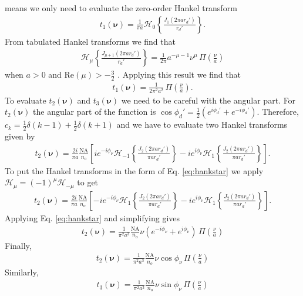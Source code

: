\documentclass[11pt]{article}
\providecommand{\bs}[1]{\boldsymbol{#1}}
\begin{document}
means we only need to evaluate the zero-order Hankel transform
\begin{align}
  t_1(\bs{\nu}) = \frac{1}{\pi a}\mathcal{H}_0\left\{\frac{J_1(2\pi ar_d')}{r_d'}\right\}.
\end{align}
From tabulated Hankel transforms we find that
\begin{align}
  \mathcal{H}_{\mu}\left\{\frac{J_{\mu+1}(2\pi ar_d')}{r_d'}\right\} =
  \frac{1}{2\pi}a^{-\mu-1}\nu^\mu\, \Pi\left(\frac{\nu}{a}\right)\label{eq:hankstar}
\end{align}
when $a > 0$ and $\text{Re}(\mu) > -\frac{3}{2}$ \cite{poul1998}. Applying this result
we find that
\begin{align}
  t_1(\bs{\nu}) =
    \frac{1}{2\pi^2 a^{2}}\, \Pi\left(\frac{\nu}{a}\right)\label{eq:t1final}.
\end{align}
To evaluate $t_2(\bs{\nu})$ and $t_3(\bs{\nu})$ we need to be careful with the angular part. For $t_2(\bs{\nu})$
the angular part of the function is $\cos\phi_d' = \frac{1}{2}\left(e^{i\phi_d'} + e^{-i\phi_d'}\right)$. Therefore, $c_k = \frac{1}{2}\delta(k-1) + \frac{1}{2}\delta(k+1)$ and we have to evaluate two Hankel transforms given by
\begin{align}
  t_2(\bs{\nu}) = \frac{2i}{\pi a}\frac{\text{NA}}{n_o}\left[ie^{-i\phi_{\nu}}\mathcal{H}_{-1}\left\{\frac{J_2(2\pi ar_d')}{\pi ar_d'}\right\} - ie^{i\phi_{\nu}}\mathcal{H}_{1}\left\{\frac{J_2(2\pi ar_d')}{\pi ar_d'}\right\}\right].
\end{align}
To put the Hankel transforms in the form of Eq. \ref{eq:hankstar} we apply
$\mathcal{H}_\mu = (-1)^\mu\mathcal{H}_{-\mu}$ to get
\begin{align}
  t_2(\bs{\nu}) = \frac{2i}{\pi a}\frac{\text{NA}}{n_o}\left[-ie^{-i\phi_{\nu}}\mathcal{H}_{1}\left\{\frac{J_2(2\pi ar_d')}{\pi ar_d'}\right\} - ie^{i\phi_{\nu}}\mathcal{H}_{1}\left\{\frac{J_2(2\pi ar_d')}{\pi ar_d'}\right\}\right].
\end{align}
Applying Eq. \ref{eq:hankstar} and simplifying gives
\begin{align}
  t_2(\bs{\nu}) =
    \frac{1}{\pi^2 a^3}\frac{\text{NA}}{n_o}\nu(e^{-i\phi_\nu} + e^{i\phi_\nu})\, \Pi\left(\frac{\nu}{a}\right)
\end{align}
Finally, 
\begin{align}
  t_2(\bs{\nu}) =
    \frac{1}{\pi^2 a^3}\frac{\text{NA}}{n_o}\nu\cos\phi_{\nu}\, \Pi\left(\frac{\nu}{a}\right)\label{eq:t2final}
\end{align}
Similarly, 
\begin{align}
  t_3(\bs{\nu}) =
    \frac{1}{\pi^2 a^3}\frac{\text{NA}}{n_o}\nu\sin\phi_{\nu}\, \Pi\left(\frac{\nu}{a}\right)\label{eq:t3final}
\end{align}
\end{document}
